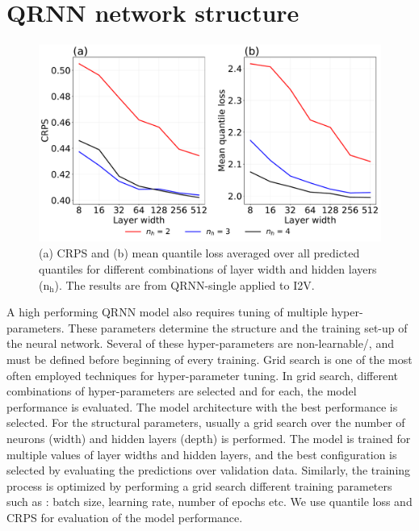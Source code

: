 \documentclass[amt, manuscript]{copernicus}
\begin{document}
\section{QRNN network structure}
\label{appendix:hyperparamter}
%
\begin{figure}[t]
	\centering
	\includegraphics[height = 65mm]{Figures/figB1.pdf} 
	\caption{(a) CRPS  and (b) mean quantile loss averaged over all predicted quantiles for different combinations of layer width and hidden layers ($\mathrm{n_h}$). The results are from QRNN-single applied to I2V.}
	\label{fig:grid_search}	
\end{figure}
A high performing QRNN model also requires tuning of multiple hyper-parameters. These parameters determine the structure and the training set-up of the neural network. Several of these hyper-parameters are non-learnable/, and must be defined before beginning of every training. Grid search is one of the most often employed techniques for hyper-parameter tuning. In grid search, different combinations of hyper-parameters are selected and for each, the model performance is evaluated. The model architecture with the best performance is selected. For the structural parameters, usually a grid search over the number of neurons (width) and hidden layers (depth) is performed. The model is trained for multiple values of layer widths and hidden layers, and the best configuration is selected by evaluating the predictions over validation data. Similarly, the training process is optimized by performing a grid search different training parameters such as : batch size, learning rate, number of epochs etc. We use quantile loss and CRPS for evaluation of the model performance.
\end{document}
